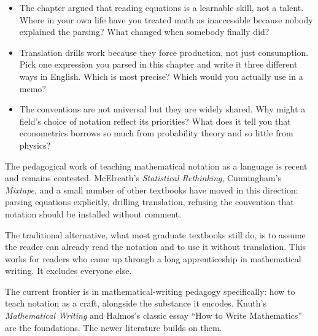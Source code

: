 \documentclass[
  letterpaper,
  11pt,
  twoside,
  openany]{scrbook}
\begin{document}
\begin{tcolorbox}[enhanced jigsaw, arc=.35mm, bottomrule=.15mm, bottomtitle=1mm, breakable, colback=white, colbacktitle=quarto-callout-caution-color!10!white, colframe=quarto-callout-caution-color-frame, coltitle=black, left=2mm, leftrule=.75mm, opacityback=0, opacitybacktitle=0.6, rightrule=.15mm, title=\textcolor{quarto-callout-caution-color}{\faFire}\hspace{0.5em}{Reflect before moving on}, titlerule=0mm, toprule=.15mm, toptitle=1mm]

\begin{itemize}
\item
  The chapter argued that reading equations is a learnable skill, not a
  talent. Where in your own life have you treated math as inaccessible
  because nobody explained the parsing? What changed when somebody
  finally did?
\item
  Translation drills work because they force production, not just
  consumption. Pick one expression you parsed in this chapter and write
  it three different ways in English. Which is most precise? Which would
  you actually use in a memo?
\item
  The conventions are not universal but they are widely shared. Why
  might a field's choice of notation reflect its priorities? What does
  it tell you that econometrics borrows so much from probability theory
  and so little from physics?
\end{itemize}

\end{tcolorbox}

\begin{tcolorbox}[enhanced jigsaw, arc=.35mm, bottomrule=.15mm, bottomtitle=1mm, breakable, colback=white, colbacktitle=quarto-callout-important-color!10!white, colframe=quarto-callout-important-color-frame, coltitle=black, left=2mm, leftrule=.75mm, opacityback=0, opacitybacktitle=0.6, rightrule=.15mm, title=\textcolor{quarto-callout-important-color}{\faExclamation}\hspace{0.5em}{Frontier note}, titlerule=0mm, toprule=.15mm, toptitle=1mm]

The pedagogical work of teaching mathematical notation as a language is
recent and remains contested. McElreath's \emph{Statistical Rethinking},
Cunningham's \emph{Mixtape}, and a small number of other textbooks have
moved in this direction: parsing equations explicitly, drilling
translation, refusing the convention that notation should be installed
without comment.

The traditional alternative, what most graduate textbooks still do, is
to assume the reader can already read the notation and to use it without
translation. This works for readers who came up through a long
apprenticeship in mathematical writing. It excludes everyone else.

The current frontier is in mathematical-writing pedagogy specifically:
how to teach notation as a craft, alongside the substance it encodes.
Knuth's \emph{Mathematical Writing} and Halmos's classic essay ``How to
Write Mathematics'' are the foundations. The newer literature builds on
them.

\end{tcolorbox}
\end{document}
